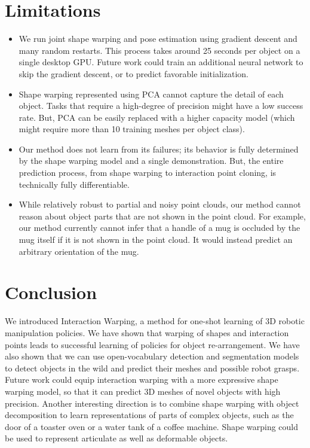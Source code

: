 \documentclass{article}
\begin{document}
\section{Limitations}

\begin{itemize}
    \item We run joint shape warping and pose estimation using gradient descent and many random restarts. This process takes around 25 seconds per object on a single desktop GPU. Future work could train an additional neural network to skip the gradient descent, or to predict favorable initialization.
    \item Shape warping represented using PCA cannot capture the detail of each object. Tasks that require a high-degree of precision might have a low success rate. But, PCA can be easily replaced with a higher capacity model (which might require more than 10 training meshes per object class).
    \item Our method does not learn from its failures; its behavior is fully determined by the shape warping model and a single demonstration. But, the entire prediction process, from shape warping to interaction point cloning, is technically fully differentiable.
    \item While relatively robust to partial and noisy point clouds, our method cannot reason about object parts that are not shown in the point cloud. For example, our method currently cannot infer that a handle of a mug is occluded by the mug itself if it is not shown in the point cloud. It would instead predict an arbitrary orientation of the mug.
\end{itemize}

\section{Conclusion}

We introduced Interaction Warping, a method for one-shot learning of 3D robotic manipulation policies. We have shown that warping of shapes and interaction points leads to successful learning of policies for object re-arrangement. We have also shown that we can use open-vocabulary detection and segmentation models to detect objects in the wild and predict their meshes and possible robot grasps. Future work could equip interaction warping with a more expressive shape warping model, so that it can predict 3D meshes of novel objects with high precision. Another interesting direction is to combine shape warping with object decomposition \cite{tenorth13decomposing,vahrenkamp16partbased,chen22neural} to learn representations of parts of complex objects, such as the door of a toaster oven or a water tank of a coffee machine. Shape warping could be used to represent articulate as well as deformable objects.
\end{document}
